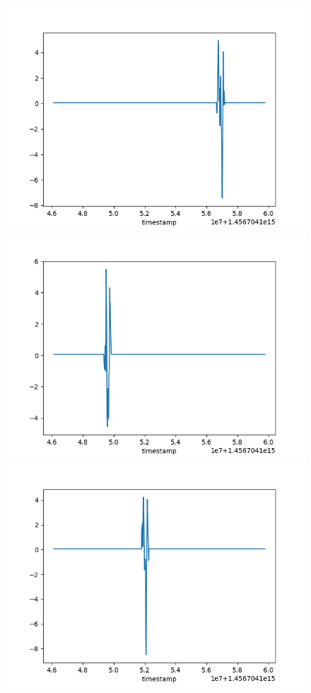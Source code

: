 \documentclass{beamer}
\begin{document}
\begin{frame}
\begin{figure}
	\includegraphics[scale=.15]{point_8}
    \includegraphics[scale=.15]{point_9}
    \includegraphics[scale=.15]{point_10}
\end{figure}

\end{frame}
\end{document}
